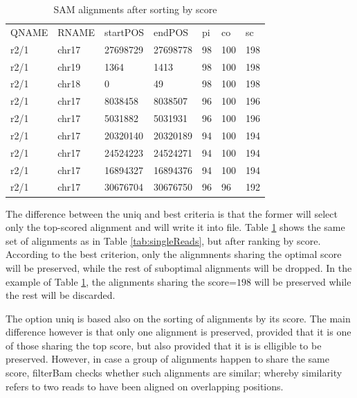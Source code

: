 \documentclass[11pt]{article}
\newcommand{\option}[1]{{\fontfamily{phv}\selectfont#1}}
\begin{document}
{\begin{landscape}
  \begin{table}\footnotesize
\begin{center}
    \begin{tabular*}{0.75\textwidth}{|l|l|l|l|l|l|l|}
	\cline{1-7}
	  QNAME & RNAME & startPOS & endPOS & pi & co & sc \\ \cline{1-7}
      r2/1 & chr17 & 27698729 & 27698778 & 98 & 100 & 198 \\ \cline{1-7}
      r2/1 & chr19 & 1364 & 1413 & 98 & 100 & 198 \\ \cline{1-7}
      r2/1 & chr18 & 0 & 49 & 98 & 100 & 198 \\ \cline{1-7}
      r2/1 & chr17 & 8038458 & 8038507 & 96 & 100 & 196 \\ \cline{1-7}
      r2/1 & chr17 & 5031882 & 5031931 & 96 & 100 & 196 \\ \cline{1-7}
      r2/1 & chr17 & 20320140 & 20320189 & 94 & 100 & 194 \\ \cline{1-7}
      r2/1 & chr17 & 24524223 & 24524271 & 94 & 100 & 194 \\ \cline{1-7}
      r2/1 & chr17 & 16894327 & 16894376 & 94 & 100 & 194 \\ \cline{1-7}
      r2/1 & chr17 & 30676704 & 30676750 & 96 & 96 & 192 \\ \cline{1-7}
    \end{tabular*}
    \caption{SAM alignments after sorting by score}
    \label{tab:sortedReads}
\end{center}
  \end{table}

\end{landscape}

The difference between the \option{uniq} and \option{best} criteria is that the former will select only 
the top-scored alignment and will write it into file. Table \ref{tab:sortedReads} shows the same set of 
alignments as in Table \ref{tab:singleReads}, but after ranking by score. According to the \option{best} 
criterion, only the alignmnents sharing the optimal score will be preserved, while the rest of suboptimal 
alignments will be dropped. In the example of Table \ref{tab:sortedReads}, the alignments sharing the 
score=$198$ will be preserved while the rest will be discarded. 

The option \option{uniq} is based also on the sorting of alignments by its score. The main difference however 
is that only one alignment is preserved, provided that it is one of those sharing the top score, but also 
provided that it is  is elligible to be preserved. However, in case a group of alignments happen to share 
the same score, filterBam checks whether such alignments are similar; whereby similarity refers to two 
reads to have been aligned on overlapping positions. 

}
\end{document}
